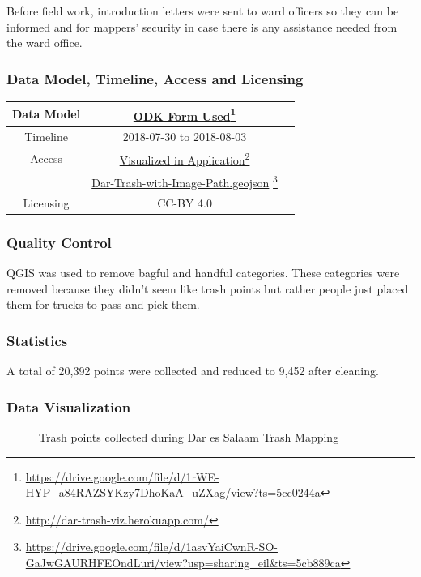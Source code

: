 \documentclass[a4paper,12pt,twoside]{article}
\begin{document}
Before field work, introduction letters were sent to ward officers so they can be informed and for mappers’ security in case there is any assistance needed from the ward office.

\subsubsection{Data Model, Timeline, Access and Licensing}
\begin{center}
\begin{tabular}{|c|c|c|}  

 \hline
Data Model &
\href{https://drive.google.com/file/d/1rWE-HYP_a84RAZSYKzy7DhoKaA_uZXag/view?ts=5cc0244a}{ODK Form Used}\footnote{\url{https://drive.google.com/file/d/1rWE-HYP_a84RAZSYKzy7DhoKaA_uZXag/view?ts=5cc0244a}} \\
 \hline
  Timeline  &  2018-07-30 to 2018-08-03 \\
\hline  
Access & {\href{http://dar-trash-viz.herokuapp.com/}{Visualized in Application}\footnote{\url{http://dar-trash-viz.herokuapp.com/}}}\\
{} & {\href{https://drive.google.com/file/d/1asvYaiCwnR-SO-GaJwGAURHFEOndLuri/view?usp=sharing_eil&ts=5cb889ca}{Dar-Trash-with-Image-Path.geojson} \footnote{\url{https://drive.google.com/file/d/1asvYaiCwnR-SO-GaJwGAURHFEOndLuri/view?usp=sharing_eil&ts=5cb889ca}}}\\
\hline
Licensing & CC-BY 4.0\\
\hline

\end{tabular}
\end{center}

\subsubsection{Quality Control}
QGIS was used to remove bagful and handful categories.
These categories were removed because they didn't seem like trash points but rather people just placed them for trucks to pass and pick them.


\subsubsection{Statistics}
A total of 20,392 points were collected and reduced to 9,452 after cleaning.

\subsubsection{Data Visualization}
\begin{figure}[h]
  \color{RHgreen}\caption{Trash points collected during Dar es Salaam Trash Mapping}
  \centering
\end{figure}
\end{document}
